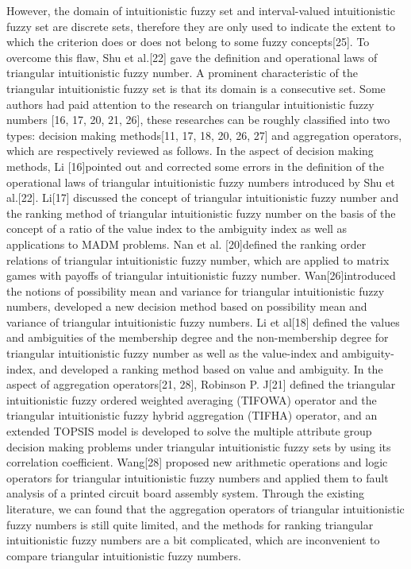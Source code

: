 \documentclass[a4paper]{article}
\begin{document}
However, the domain of intuitionistic fuzzy set and interval-valued intuitionistic fuzzy
set are discrete sets, therefore they are only used to indicate the extent to which the criterion 
does or does not belong to some fuzzy concepts[25]. To overcome this flaw, Shu et al.[22]
gave the definition and operational laws of triangular intuitionistic fuzzy number. A 
prominent characteristic of the triangular intuitionistic fuzzy set is that its domain is a 
consecutive set. Some authors had paid attention to the research on triangular intuitionistic
fuzzy numbers [16, 17, 20, 21, 26], these researches can be roughly classified into two 
types: decision making methods[11, 17, 18, 20, 26, 27] and aggregation operators, which 
are respectively reviewed as follows. In the aspect of decision making methods, Li 
[16]pointed out and corrected some errors in the definition of the operational laws of
triangular intuitionistic fuzzy numbers introduced by Shu et al.[22]. Li[17] discussed the 
concept of triangular intuitionistic fuzzy number and the ranking method of triangular 
intuitionistic fuzzy number on the basis of the concept of a ratio of the value index to the 
ambiguity index as well as applications to MADM problems. Nan et al. [20]defined the 
ranking order relations of triangular intuitionistic fuzzy number, which are applied to 
matrix games with payoffs of triangular intuitionistic fuzzy number. Wan[26]introduced the 
notions of possibility mean and variance for triangular intuitionistic fuzzy numbers, 
developed a new decision method based on possibility mean and variance of triangular 
intuitionistic fuzzy numbers. Li et al[18] defined the values and ambiguities of the 
membership degree and the non-membership degree for triangular intuitionistic fuzzy 
number as well as the value-index and ambiguity-index, and developed a ranking method 
based on value and ambiguity. In the aspect of aggregation operators[21, 28], Robinson P. 
J[21] defined the triangular intuitionistic fuzzy ordered weighted averaging (TIFOWA) 
operator and the triangular intuitionistic fuzzy hybrid aggregation (TIFHA) operator, and an 
extended TOPSIS model is developed to solve the multiple attribute group decision making 
problems under triangular intuitionistic fuzzy sets by using its correlation coefficient. 
Wang[28] proposed new arithmetic operations and logic operators for triangular 
intuitionistic fuzzy numbers and applied them to fault analysis of a printed circuit board 
assembly system. Through the existing literature, we can found that the aggregation 
operators of triangular intuitionistic fuzzy numbers is still quite limited, and the 
methods for ranking triangular intuitionistic fuzzy numbers are a bit complicated, 
which are inconvenient to compare triangular intuitionistic fuzzy numbers. 
\end{document}
